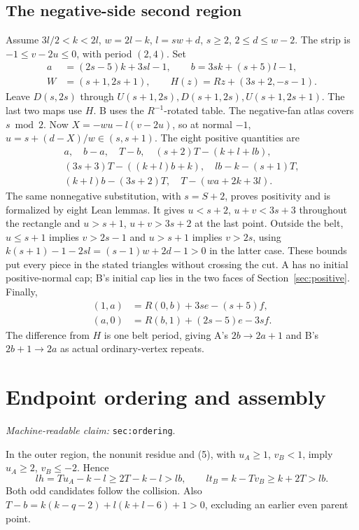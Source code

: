 \documentclass[11pt]{amsart}
\newcommand{\record}[1]{\nolinkurl{#1}}
\newcommand{\claimid}[1]{\par\nopagebreak\noindent\textit{Machine-readable claim:} \record{#1}.\par}
\begin{document}
\subsection{The negative-side second region}
Assume $3l/2<k<2l$, $w=2l-k$, $l=sw+d$, $s\ge2$,
$2\le d\le w-2$. The strip is $-1\le v-2u\le0$, with period
$(2,4)$. Set
\[
\begin{split}
a&=(2s-5)k+3sl-1,\qquad b=3sk+(s+5)l-1,\\
W&=(s+1,2s+1),\qquad H(z)=Rz+(3s+2,-s-1).
\end{split}
\]
Leave $D(s,2s)$ through $U(s+1,2s),D(s+1,2s),U(s+1,2s+1)$.
The last two maps use $H$. B uses the $R^{-1}$-rotated table.
The negative-fan atlas covers $s\bmod2$.
Now $X=-wu-l(v-2u)$, so at normal $-1$,
$u=s+(d-X)/w\in(s,s+1)$. The eight positive quantities are
\begin{equation}\label{eq:10}
\begin{gathered}
a,\quad b-a,\quad T-b,\quad (s+2)T-(k+l+lb),\\
(3s+3)T-((k+l)b+k),\quad lb-k-(s+1)T,\\
(k+l)b-(3s+2)T,\quad T-(wa+2k+3l).
\end{gathered}\tag{10}
\end{equation}
The same nonnegative substitution, with $s=S+2$, proves positivity
and is formalized by eight Lean lemmas. It gives $u<s+2$, $u+v<3s+3$
throughout the rectangle and $u>s+1$, $u+v>3s+2$ at the last point.
Outside the belt, $u\le s+1$ implies $v>2s-1$ and $u>s+1$ implies
$v>2s$, using
$k(s+1)-1-2sl=(s-1)w+2d-1>0$ in the latter case.
These bounds put every piece in the stated triangles without crossing
the cut. A has no initial positive-normal cap; B's initial cap lies
in the two faces of Section~\ref{sec:positive}. Finally,
\begin{equation}\label{eq:11}
\begin{aligned}
(1,a)&=R(0,b)+3se-(s+5)f,\\
(a,0)&=R(b,1)+(2s-5)e-3sf.
\end{aligned}\tag{11}
\end{equation}
The difference from $H$ is one belt period, giving A's
$2b\to2a+1$ and B's $2b+1\to2a$ as actual ordinary-vertex repeats.

\section{Endpoint ordering and assembly}\label{sec:ordering}
\claimid{sec:ordering}
In the outer region, the nonunit residue and (5), with
$u_A\ge1$, $v_B<1$, imply $u_A\ge2$, $v_B\le-2$. Hence
\[
 lh=Tu_A-k-l\ge2T-k-l>lb,\qquad
 lt_B=k-Tv_B\ge k+2T>lb.
\]
Both odd candidates follow the collision. Also
$T-b=k(k-q-2)+l(k+l-6)+1>0$, excluding an earlier even parent point.
\end{document}
